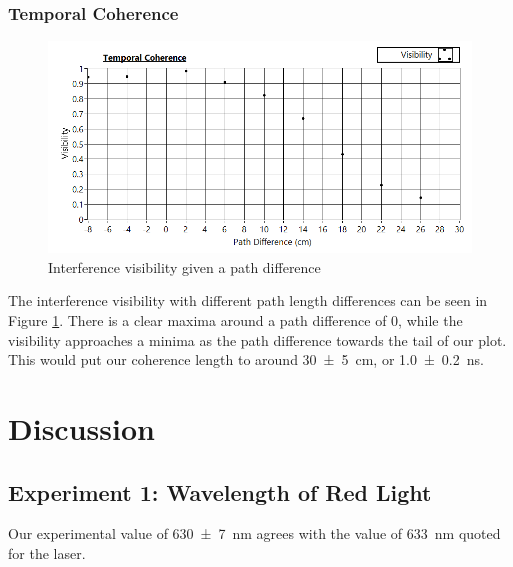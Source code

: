 \documentclass[a4paper]{scrartcl}
\begin{document}
\subsubsection{Temporal Coherence}
\begin{figure}
    \centering
    \includegraphics[width = 18cm]{Q8/plot.png}
    \caption{Interference visibility given a path difference}
    \label{fig:interference-visibility}
\end{figure}
The interference visibility with different path length differences can be seen in Figure \ref{fig:interference-visibility}. There is a clear maxima around a path difference of 0, while the visibility approaches a minima as the path difference towards the tail of our plot. This would put our coherence length to around \SI{30 \pm 5}{\centi\metre}, or \SI{1.0 \pm 0.2}{\nano\second}.

\section{Discussion}
\subsection{Experiment 1: Wavelength of Red Light}
Our experimental value of \SI{630 \pm 7}{\nano\metre} agrees with the value of \SI{633}{\nano\metre} quoted for the laser.
\end{document}
